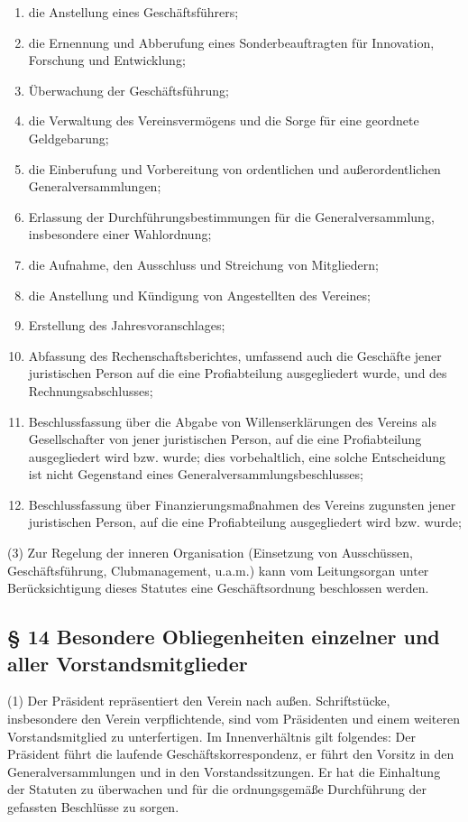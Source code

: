 \documentclass[10pt,a4paper]{article}
\begin{document}
\begin{enumerate}
\item
die Anstellung eines Geschäftsführers;
\item
die Ernennung und Abberufung eines Sonderbeauftragten für Innovation, Forschung und Entwicklung;
\item
Überwachung der Geschäftsführung;
\item
die Verwaltung des Vereinsvermögens und die Sorge für eine geordnete Geldgebarung;
\item
die Einberufung und Vorbereitung von ordentlichen und außerordentlichen Generalversammlungen;
\item
Erlassung der Durchführungsbestimmungen für die Generalversammlung, insbesondere einer Wahlordnung;
\item
die Aufnahme, den Ausschluss und Streichung von Mitgliedern;
\item
die Anstellung und Kündigung von Angestellten des Vereines;
\item
Erstellung des Jahresvoranschlages;
\item
Abfassung des Rechenschaftsberichtes, umfassend auch die Geschäfte jener juristischen Person auf die eine Profiabteilung ausgegliedert wurde, und des Rechnungsabschlusses;
\item
Beschlussfassung über die Abgabe von Willenserklärungen des Vereins als Gesellschafter von jener juristischen Person, auf die eine Profiabteilung ausgegliedert wird bzw. wurde; dies vorbehaltlich, eine solche Entscheidung ist nicht Gegenstand eines Generalversammlungsbeschlusses;
\item
Beschlussfassung über Finanzierungsmaßnahmen des Vereins zugunsten jener juristischen Person, auf die eine Profiabteilung ausgegliedert wird bzw. wurde;
\end{enumerate}

(3)
Zur Regelung der inneren Organisation (Einsetzung von Ausschüssen, Geschäftsführung, Clubmanagement, u.a.m.) kann vom Leitungsorgan unter Berücksichtigung dieses Statutes eine Geschäftsordnung beschlossen werden.

\subsection{§ 14
Besondere Obliegenheiten einzelner und aller Vorstandsmitglieder}

(1)
Der Präsident repräsentiert den Verein nach außen.
Schriftstücke, insbesondere den Verein verpflichtende, sind vom Präsidenten und einem weiteren Vorstandsmitglied zu unterfertigen.
Im Innenverhältnis gilt folgendes:
Der Präsident führt die laufende Geschäftskorrespondenz, er führt den Vorsitz in den Generalversammlungen und in den Vorstandssitzungen.
Er hat die Einhaltung der Statuten zu überwachen und für die ordnungsgemäße Durchführung der gefassten Beschlüsse zu sorgen.
\end{document}
